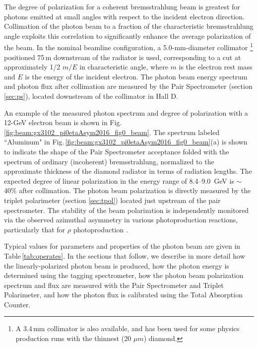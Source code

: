 The degree of polarization for a coherent bremsstrahlung beam is greatest for photons emitted at small
angles with respect to the incident electron direction. Collimation of the photon beam to a fraction
of the characteristic brems\-strah\-lung angle exploits this correlation to significantly enhance
the average polarization of the beam. 
In the nominal \GX{} beamline configuration, a 5.0-mm-diameter collimator
\footnote{A 3.4\,mm collimator is also available, and has been used for some physics production runs
with the thinnest (20 $\mu m$) diamond.}
positioned 75\,m downstream of the radiator is used, corresponding to a cut at approximately
1/2 $m/E$ in characteristic angle, where $m$ is the electron rest mass and
$E$ is the energy of the incident electron. 
The photon beam energy spectrum and photon flux after collimation are measured
by the Pair Spectrometer (section \ref{sec:ps}), located downstream of the collimator in Hall D. 

An example of the measured photon spectrum and degree of polarization with a 12-GeV electron beam is
shown in Fig.\,\ref{fig:beam:gx3102_pi0etaAsym2016_fig0_beam}. The spectrum labeled ``Aluminum" in 
Fig.\,\ref{fig:beam:gx3102_pi0etaAsym2016_fig0_beam}(a) is shown to indicate the shape of the 
Pair Spectrometer acceptance folded with the spectrum of ordinary (incoherent) brems\-strah\-lung,
normalized to the approximate thickness of the diamond radiator in terms of radiation lengths.
The expected degree of linear polarization in the energy range of 8.4--9.0~GeV is $\sim$40\% after
collimation.  The photon beam polarization is directly measured by the triplet polarimeter (section \ref{sec:tpol})
located just upstream of the pair spectrometer. The stability of the beam polarization is independently
monitored via the observed azimuthal asymmetry in various photoproduction reactions, particularly that for $\rho$ photoproduction \cite{gx3076}.

Typical values for parameters and properties of the photon beam are given in Table\,\ref{tab:operates}.
In the sections that follow, we describe in more detail how the linearly-polarized photon beam
is produced, how the photon energy is determined using the tagging spectrometer, how the photon beam polarization
spectrum and flux are measured with the Pair Spectrometer and Triplet Polarimeter, and how the photon
flux is calibrated using the Total Absorption Counter.

